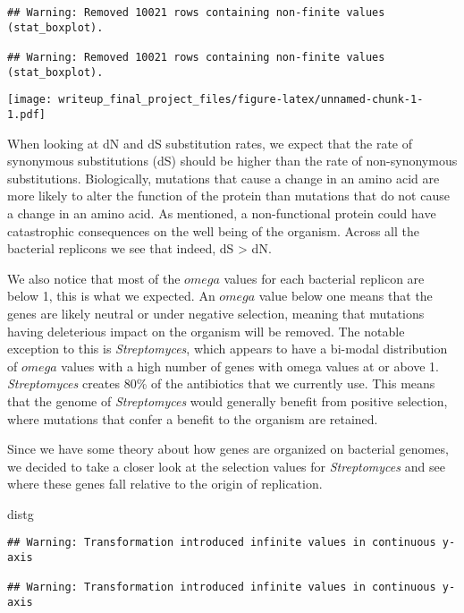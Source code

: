 \documentclass[12pt,]{article}
\newenvironment{Shaded}{\begin{snugshade}}{\end{snugshade}}
\newcommand{\NormalTok}[1]{#1}
\begin{document}
\begin{verbatim}
## Warning: Removed 10021 rows containing non-finite values (stat_boxplot).

## Warning: Removed 10021 rows containing non-finite values (stat_boxplot).
\end{verbatim}

\texttt{[image: writeup\_final\_project\_files/figure-latex/unnamed-chunk-1-1.pdf]}

When looking at dN and dS substitution rates, we expect that the rate of
synonymous substitutions (dS) should be higher than the rate of
non-synonymous substitutions. Biologically, mutations that cause a
change in an amino acid are more likely to alter the function of the
protein than mutations that do not cause a change in an amino acid. As
mentioned, a non-functional protein could have catastrophic consequences
on the well being of the organism. Across all the bacterial replicons we
see that indeed, dS \textgreater{} dN.

We also notice that most of the \(omega\) values for each bacterial
replicon are below 1, this is what we expected. An \(omega\) value below
one means that the genes are likely neutral or under negative selection,
meaning that mutations having deleterious impact on the organism will be
removed. The notable exception to this is \textit{Streptomyces}\xspace ,
which appears to have a bi-modal distribution of \(omega\) values with a
high number of genes with omega values at or above 1.
\textit{Streptomyces}\xspace creates 80\% of the antibiotics that we
currently use. This means that the genome of
\textit{Streptomyces}\xspace would generally benefit from positive
selection, where mutations that confer a benefit to the organism are
retained.

Since we have some theory about how genes are organized on bacterial
genomes, we decided to take a closer look at the selection values for
\textit{Streptomyces}\xspace and see where these genes fall relative to
the origin of replication.

\begin{Shaded}
\begin{Highlighting}[]
\NormalTok{distg}
\end{Highlighting}
\end{Shaded}

\begin{verbatim}
## Warning: Transformation introduced infinite values in continuous y-axis

## Warning: Transformation introduced infinite values in continuous y-axis
\end{verbatim}
\end{document}

